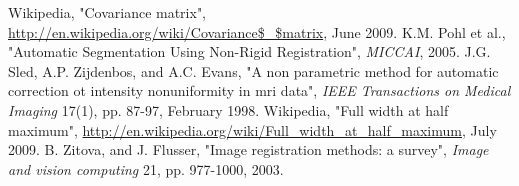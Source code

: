 \begin{thebibliography}{9999}
%
Wikipedia, "Covariance matrix", \url{http://en.wikipedia.org/wiki/Covariance$\_$matrix}, June 2009.
%
K.M. Pohl et al., "Automatic Segmentation Using Non-Rigid Registration", \textsl{MICCAI}, 2005.
%
J.G. Sled, A.P. Zijdenbos, and A.C. Evans, "A non parametric method for automatic correction ot intensity nonuniformity in mri data", \textsl{IEEE Transactions on Medical Imaging} 17(1), pp. 87-97, February 1998.
%
Wikipedia, "Full width at half maximum", \url{http://en.wikipedia.org/wiki/Full_width_at_half_maximum}, July 2009.
%
B. Zitova, and J. Flusser, "Image registration methods: a survey", \textsl{Image and vision computing} 21, pp. 977-1000, 2003.
%
%
\end{thebibliography}
